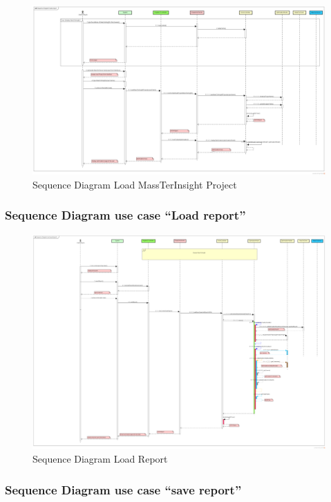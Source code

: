 \documentclass[12pt]{article}
\begin{document}
	
		\begin{figure}[h]
		\centering
		\includegraphics[width=1\textwidth]{SequenceDiagramLoadProject.png}
		\caption{Sequence Diagram Load MassTerInsight Project}
	\end{figure}
	\clearpage
	\newpage
	\subsubsection{Sequence Diagram use case ``Load report''}
		\begin{figure}[h]
		\centering
		\includegraphics[width=1\textwidth]{SequenceDiagramLoadReport.png}
		\caption{Sequence Diagram Load Report}
	\end{figure}
	\clearpage
	\newpage
	\subsubsection{Sequence Diagram use case ``save report''}
	\clearpage
	\newpage
\end{document}
